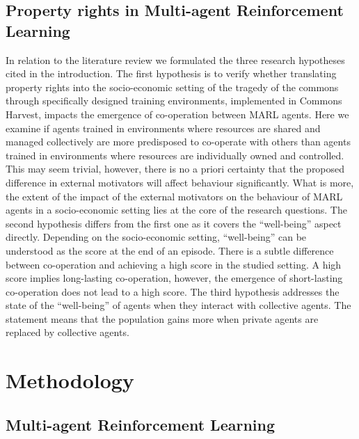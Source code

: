 \documentclass[pdflatex,sn-basic,lineno]{sn-jnl}
\theoremstyle{thmstyleone}%
\theoremstyle{thmstyletwo}%
\theoremstyle{thmstylethree}%
\begin{document}
\subsection{Property rights in Multi-agent Reinforcement Learning}\label{subsec2-3}
 
In relation to the literature review we formulated the three research hypotheses cited in the introduction. The first
hypothesis is to verify whether translating property rights into the socio-economic setting of the tragedy of the
commons through specifically designed training environments, implemented in Commons Harvest, impacts the emergence of
co-operation between MARL agents. Here we examine if agents trained in environments where resources are shared and
managed collectively are more predisposed to co-operate with others than agents trained in environments where resources
are individually owned and controlled. This may seem trivial, however, there is no a priori certainty that the proposed
difference in external motivators will affect behaviour significantly. What is more, the extent of the impact of the
external motivators on the behaviour of MARL agents in a socio-economic setting lies at the core of the research
questions. The second hypothesis differs from the first one as it covers the “well-being” aspect directly. Depending on
the socio-economic setting, “well-being” can be understood as the score at the end of an episode. There is a subtle
difference between co-operation and achieving a high score in the studied setting. A high score implies long-lasting
co-operation, however, the emergence of short-lasting co-operation does not lead to a high score. The third hypothesis
addresses the state of the “well-being” of agents when they interact with collective agents. The statement means that
the population gains more when private agents are replaced by collective agents.



\section{Methodology}\label{sec3}

\subsection{Multi-agent Reinforcement Learning}\label{subsec3-1}
\end{document}
